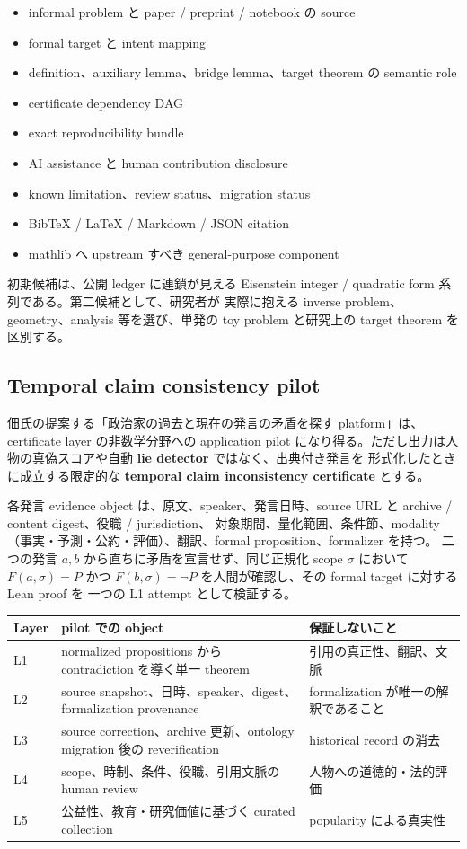 \documentclass[a4paper,11pt]{ltjsarticle}
\newcommand{\term}[1]{\textbf{\color{TFNavy}#1}}
\begin{document}
\begin{itemize}
  \item informal problem と paper / preprint / notebook の source
  \item formal target と intent mapping
  \item definition、auxiliary lemma、bridge lemma、target theorem の semantic role
  \item certificate dependency DAG
  \item exact reproducibility bundle
  \item AI assistance と human contribution disclosure
  \item known limitation、review status、migration status
  \item BibTeX / LaTeX / Markdown / JSON citation
  \item mathlib へ upstream すべき general-purpose component
\end{itemize}

初期候補は、公開 ledger に連鎖が見える Eisenstein integer / quadratic form 系列である。第二候補として、研究者が
実際に抱える inverse problem、geometry、analysis 等を選び、単発の toy problem と研究上の target theorem を区別する。

\subsection{Temporal claim consistency pilot}

佃氏の提案する「政治家の過去と現在の発言の矛盾を探す platform」は、certificate layer の非数学分野への
application pilot になり得る。ただし出力は人物の真偽スコアや自動 \term{lie detector} ではなく、出典付き発言を
形式化したときに成立する限定的な \term{temporal claim inconsistency certificate} とする。

各発言 evidence object は、原文、speaker、発言日時、source URL と archive / content digest、役職 / jurisdiction、
対象期間、量化範囲、条件節、modality（事実・予測・公約・評価）、翻訳、formal proposition、formalizer を持つ。
二つの発言 $a,b$ から直ちに矛盾を宣言せず、同じ正規化 scope $\sigma$ において
\(F(a,\sigma)=P\) かつ \(F(b,\sigma)=\neg P\) を人間が確認し、その formal target に対する Lean proof を
一つの L1 attempt として検証する。

\begin{tabularx}{0.96\linewidth}{L{26mm}L{54mm}Y}
\toprule
\textbf{Layer} & \textbf{pilot での object} & \textbf{保証しないこと} \\
\midrule
L1 & normalized propositions から contradiction を導く単一 theorem & 引用の真正性、翻訳、文脈 \\
L2 & source snapshot、日時、speaker、digest、formalization provenance & formalization が唯一の解釈であること \\
L3 & source correction、archive 更新、ontology migration 後の reverification & historical record の消去 \\
L4 & scope、時制、条件、役職、引用文脈の human review & 人物への道徳的・法的評価 \\
L5 & 公益性、教育・研究価値に基づく curated collection & popularity による真実性 \\
\bottomrule
\end{tabularx}
\end{document}
